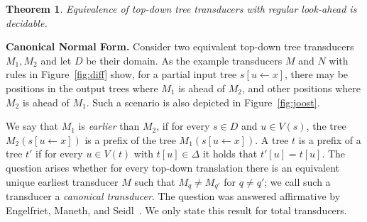 \documentclass[copyright,creativecommons]{eptcs}
\newtheorem{theorem}{Theorem}
\begin{document}
\begin{theorem}\rm\label{theo:dtr}
Equivalence of top-down tree transducers with
regular look-ahead is decidable.
\end{theorem}


\medskip

{\bf Canonical Normal Form.}\quad
Consider two equivalent top-down tree transducers $M_1, M_2$
and let $D$ be their domain. 
As the example transducers $M$ and $N$ with rules
in Figure~\ref{fig:diff} show, 
for a partial input tree $s[u\leftarrow x]$, 
there may be positions in the output trees
where $M_1$ is ahead of $M_2$, and other positions
where $M_2$ is ahead of $M_1$. 
Such a scenario is also depicted in Figure~\ref{fig:joost}.

We say that $M_1$ is \emph{earlier} than $M_2$,
if for every $s\in D$ and $u\in V(s)$, 
the tree $M_2(s[u\leftarrow x])$ is a prefix of the tree $M_1(s[u\leftarrow x])$.
A tree $t$ is a prefix of a tree $t'$ if for every $u\in V(t)$
with $t[u]\in\Delta$ it holds that $t'[u]=t[u]$. 
The question arises whether for every top-down translation there is an
equivalent unique earliest transducer $M$ such that
$M_q\not= M_{q'}$ for $q\not= q'$; we call such a transducer
a \emph{canonical transducer}.
The question was answered affirmative by
Engelfriet, Maneth, and Seidl~\cite{DBLP:journals/jcss/EngelfrietMS09}.
We only state this result for total transducers.
\end{document}
